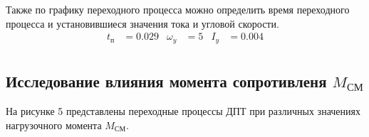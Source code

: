 \documentclass[a4paper, 12pt]{article}
\begin{document}
Также по графику переходного процесса можно определить время переходного процесса и установившиеся значения тока и угловой скорости.
\begin{align*}
    t_\text{п} & = 0.029 & \omega_y & = 5 & I_y & = 0.004 \\
\end{align*}

\newpage
\begin{center}
\section{Исследование влияния момента сопротивленя $M_\text{СМ}$}
\end{center} \par
На рисунке 5 представлены переходные процессы ДПТ при различных значениях нагрузочного момента $M_\text{СМ}$.
\end{document}
